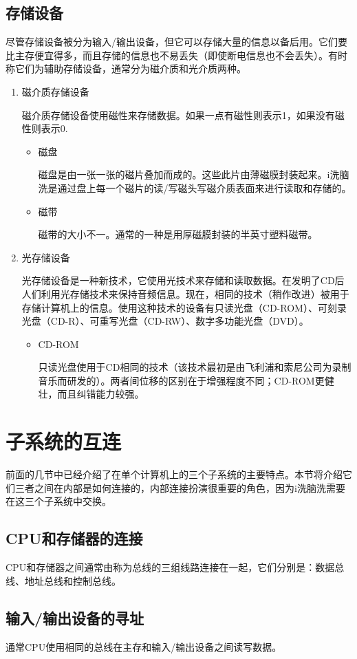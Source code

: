 \subsection{存储设备}
尽管存储设备被分为输入/输出设备，但它可以存储大量的信息以备后用。它们要比主存便宜得多，而且存储的信息也不易丢失（即使断电信息也不会丢失）。有时称它们为辅助存储设备，通常分为磁介质和光介质两种。
\begin{enumerate}
	\item 磁介质存储设备

	磁介质存储设备使用磁性来存储数据。如果一点有磁性则表示1，如果没有磁性则表示0.
	\begin{itemize}
		\item 磁盘

		磁盘是由一张一张的磁片叠加而成的。这些此片由薄磁膜封装起来。i洗脑洗是通过盘上每一个磁片的读/写磁头写磁介质表面来进行读取和存储的。
		\item 磁带

		磁带的大小不一。通常的一种是用厚磁膜封装的半英寸塑料磁带。
	\end{itemize}
	\item 光存储设备

	光存储设备是一种新技术，它使用光技术来存储和读取数据。在发明了CD后人们利用光存储技术来保持音频信息。现在，相同的技术（稍作改进）被用于存储计算机上的信息。使用这种技术的设备有只读光盘（CD-ROM）、可刻录光盘（CD-R）、可重写光盘（CD-RW）、数字多功能光盘（DVD）。
	\begin{itemize}
		\item CD-ROM

		只读光盘使用于CD相同的技术（该技术最初是由飞利浦和索尼公司为录制音乐而研发的）。两者间位移的区别在于增强程度不同；CD-ROM更健壮，而且纠错能力较强。
	\end{itemize}
\end{enumerate}
\section{子系统的互连}
前面的几节中已经介绍了在单个计算机上的三个子系统的主要特点。本节将介绍它们三者之间在内部是如何连接的，内部连接扮演很重要的角色，因为i洗脑洗需要在这三个子系统中交换。
\subsection{CPU和存储器的连接}
CPU和存储器之间通常由称为总线的三组线路连接在一起，它们分别是：数据总线、地址总线和控制总线。
\subsection{输入/输出设备的寻址}
通常CPU使用相同的总线在主存和输入/输出设备之间读写数据。
